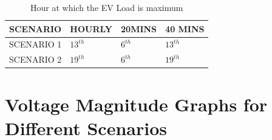 	\begin{table}[h]
		\centering
		\caption{Hour at which the EV Load is maximum }
		\begin{tabular}{|ll|ll|ll|ll|}
			\hline
			\multicolumn{2}{|l|}{\textbf{SCENARIO}} & \multicolumn{2}{l|}{\textbf{HOURLY}} & \multicolumn{2}{l|}{\textbf{20MINS}} & \multicolumn{2}{l|}{\textbf{40 MINS}} \\ \hline
			\multicolumn{2}{|l|}{SCENARIO 1}        & \multicolumn{2}{l|}{$ 13^{th} $}            & \multicolumn{2}{l|}{$ 6^{th} $}             & \multicolumn{2}{l|}{$ 13^{th} $}             \\ \hline
			\multicolumn{2}{|l|}{SCENARIO 2}        & \multicolumn{2}{l|}{$ 19^{th} $}           & \multicolumn{2}{l|}{$ 6^{th} $}             & \multicolumn{2}{l|}{$ 19^{th} $}             \\ \hline
		\end{tabular}
	\end{table}
		

	
	\section{Voltage Magnitude Graphs for Different Scenarios}
	
